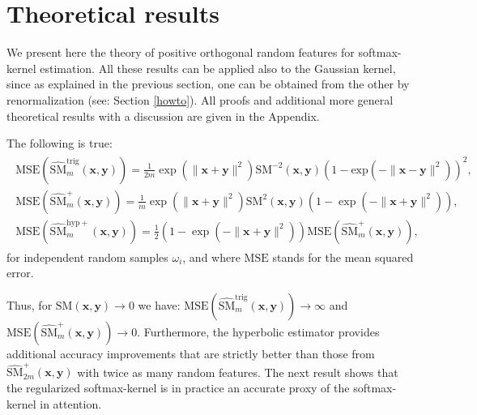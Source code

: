 \section{Theoretical results}
\label{sec:theory}

We present here the theory of positive orthogonal random features for softmax-kernel estimation. All these results can be applied also to the Gaussian kernel, since as explained in the previous section, one can be obtained from the other by renormalization (see: Section \ref{howto}).
All proofs and additional more general theoretical results with a discussion
are given in the Appendix.

\begin{lemma}
\label{mse-lemma}
The following is true:
\begin{align}
\begin{split}
\mathrm{MSE}(\widehat{\mathrm{SM}}^{\mathrm{trig}}_{m}(\mathbf{x}, \mathbf{y})) =
\frac{1}{2m} \exp(\|\mathbf{x}+\mathbf{y}\|^{2})\mathrm{SM}^{-2}(\mathbf{x},\mathbf{y})
(1-\mathrm{exp}(-\|\mathbf{x}-\mathbf{y}\|^{2}))^{2}, \\ 
\mathrm{MSE}(\widehat{\mathrm{SM}}^{\mathrm{+}}_{m}(\mathbf{x}, \mathbf{y})) = \frac{1}{m}\exp(\|\mathbf{x}+\mathbf{y}\|^{2})\mathrm{SM}^{2}(\mathbf{x},\mathbf{y})(1-\exp(-\|\mathbf{x}+\mathbf{y}\|^{2})),\\
\mathrm{MSE}(\widehat{\mathrm{SM}}^{\mathrm{hyp}+}_{m}(\mathbf{x}, \mathbf{y})) =
\frac{1}{2}(1-\exp(-\|\mathbf{x}+\mathbf{y}\|^{2}))\mathrm{MSE}(\widehat{\mathrm{SM}}^{\mathrm{+}}_{m}(\mathbf{x}, \mathbf{y})),
\end{split}
\end{align}
for independent random samples $\omega_{i}$, and where $\mathrm{MSE}$ stands for the mean squared error.
\end{lemma}
Thus, for $\mathrm{SM}(\mathbf{x}, \mathbf{y}) \rightarrow 0$ we have: $\mathrm{MSE}(\widehat{\mathrm{SM}}^{\mathrm{trig}}_{m}(\mathbf{x}, \mathbf{y})) \rightarrow \infty$ and $\mathrm{MSE}(\widehat{\mathrm{SM}}^{\mathrm{+}}_{m}(\mathbf{x}, \mathbf{y})) \rightarrow 0$. Furthermore, the hyperbolic estimator provides additional accuracy improvements that are strictly better than those from $\widehat{\mathrm{SM}}_{2m}^{\mathrm{+}}(\mathbf{x}, \mathbf{y})$ with twice as many random features. The next result shows that the regularized softmax-kernel is in practice an accurate proxy of the softmax-kernel in attention.

